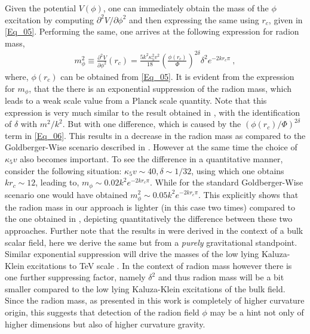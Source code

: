 \documentclass{article}
\begin{document}
Given the potential $V(\phi)$, one can immediately obtain the mass of the $\phi$ excitation by computing $\partial ^{2}V/\partial \phi ^{2}$ and then expressing the same using $r_{c}$, given in \ref{Eq_05}. Performing the same, one arrives at the following expression for radion mass,
\begin{align}\label{Eq_06}
m_{\phi}^{2}\equiv \frac{\partial ^{2}V}{\partial \phi ^{2}}(r_{c})=\frac{5k^{2}\kappa _{5}^{2}v^{2}}{18}
\left(\frac{\phi(r_{c})}{\Phi} \right)^{2\delta}\delta ^{2}e^{-2kr_{c}\pi}~,
\end{align}
where, $\phi(r_{c})$ can be obtained from \ref{Eq_05}. It is evident from the expression for $m_{\phi}$, that the there is an exponential suppression of the radion mass, which leads to a weak scale value from a Planck scale quantity. Note that this expression is very much similar to the result obtained in \cite{Goldberger:1999uk,Goldberger:1999un}, with the identification of $\delta$ with $m^{2}/k^{2}$. But with one difference, which is caused by the $(\phi(r_{c})/\Phi)^{2\delta}$ term in \ref{Eq_06}. This results in a decrease in the radion mass as compared to the Goldberger-Wise scenario described in \cite{Goldberger:1999un}. However at the same time the choice of $\kappa _{5}v$ also becomes important. To see the difference in a quantitative manner, consider the following situation: $\kappa _{5}v\sim 40, \delta \sim 1/32$, using which one obtains $kr_{c}\sim 12$, leading to, $m_{\phi}\sim 0.02 k^{2}e^{-2kr_{c}\pi}$. While for the standard Goldberger-Wise scenario one would have obtained $m_{
\phi}^{2}\sim 0.05k^{2}e^{-2kr_{c}\pi}$. This explicitly shows that the radion mass in our approach is lighter (in this case two times) compared to the one obtained in \cite{Goldberger:1999un}, depicting quantitatively the difference between these two approaches. Further note that the results in \cite{Goldberger:1999uk,Goldberger:1999un} were derived in the context of a bulk scalar field, here we derive the same but from a \emph{purely} gravitational standpoint. Similar exponential suppression will drive the masses of the low lying Kaluza-Klein excitations to TeV scale \cite{DeWolfe:1999cp,Mirabelli:1998rt,Goldberger:1999wh,Dudas:2005vna,Hewett:1998sn,Das:2011fb,Davoudiasl:1999tf,Davoudiasl:2000wi,
Chakraborty:2014xda,Chakraborty:2014zya,Hewett:2016omf,Giddings:2016sfr,Oliveira:2014kla,Cho:2013mva}. In the context of radion mass however there is one further suppressing factor, namely $\delta ^{2}$ and thus radion mass will be a bit smaller compared to the low lying Kaluza-Klein excitations of the bulk field. Since the radion mass, as presented in this work is completely of higher curvature origin, this suggests that detection of the radion field $\phi$ may be a hint not only of higher dimensions but also of higher curvature gravity.   
\end{document}
